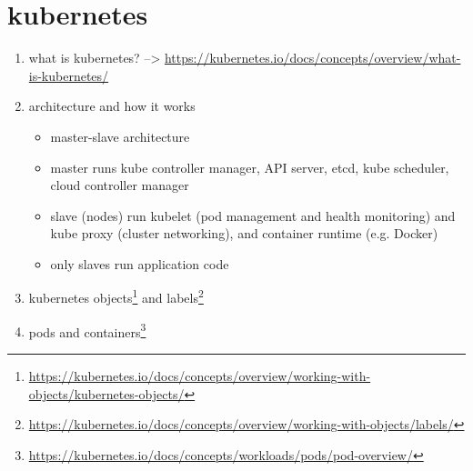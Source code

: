 \section[Kubernetes]{\gls{kubernetes}}
  \begin{enumerate}
    \item what is \gls{kubernetes}? --> \url{https://kubernetes.io/docs/concepts/overview/what-is-kubernetes/}
    \item architecture and how it works
      \begin{itemize}
        \item master-slave architecture
        \item master runs kube controller manager, API server, etcd, kube scheduler, cloud controller manager
        \item slave (nodes) run kubelet (pod management and health monitoring) and kube proxy (cluster networking), and container runtime (e.g. Docker)
        \item only slaves run application code
      \end{itemize}
    \item \gls{kubernetes} objects\footnote{\url{https://kubernetes.io/docs/concepts/overview/working-with-objects/kubernetes-objects/}} and labels\footnote{\url{https://kubernetes.io/docs/concepts/overview/working-with-objects/labels/}}
    \item pods and containers\footnote{\url{https://kubernetes.io/docs/concepts/workloads/pods/pod-overview/}}
  \end{enumerate}

